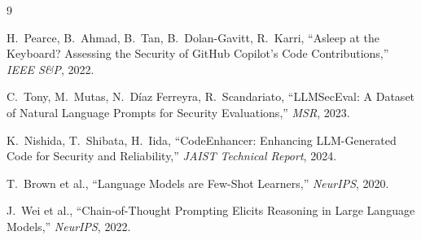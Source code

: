 \documentclass[10pt,a4paper]{article}
\begin{document}
\begin{thebibliography}{9}

H.~Pearce, B.~Ahmad, B.~Tan, B.~Dolan-Gavitt, R.~Karri,
``Asleep at the Keyboard? Assessing the Security of GitHub Copilot's Code Contributions,''
\textit{IEEE S\&P}, 2022.

C.~Tony, M.~Mutas, N.~Díaz Ferreyra, R.~Scandariato,
``LLMSecEval: A Dataset of Natural Language Prompts for Security Evaluations,''
\textit{MSR}, 2023.

K.~Nishida, T.~Shibata, H.~Iida,
``CodeEnhancer: Enhancing LLM-Generated Code for Security and Reliability,''
\textit{JAIST Technical Report}, 2024.

T.~Brown et al.,
``Language Models are Few-Shot Learners,''
\textit{NeurIPS}, 2020.

J.~Wei et al.,
``Chain-of-Thought Prompting Elicits Reasoning in Large Language Models,''
\textit{NeurIPS}, 2022.

\end{thebibliography}
\end{document}
